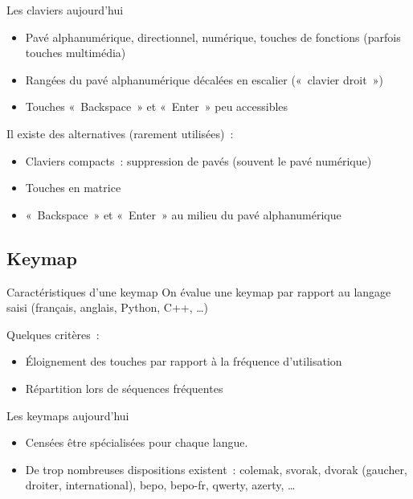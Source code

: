 \begin{frame}{Les claviers aujourd’hui}
  \begin{itemize}
    \item Pavé alphanumérique, directionnel, numérique, touches de fonctions
      (parfois touches multimédia) \pause

    \item Rangées du pavé alphanumérique décalées en escalier («~clavier
      droit~») \pause

    \item Touches «~Backspace~» et «~Enter~» peu accessibles \pause
  \end{itemize}

  Il existe des alternatives (rarement utilisées)~: \pause
  \begin{itemize}
    \item Claviers compacts~: suppression de pavés (souvent le pavé numérique)
      \pause

    \item Touches en matrice \pause

    \item «~Backspace~» et «~Enter~» au milieu du pavé alphanumérique
  \end{itemize}
\end{frame}



\subsection{Keymap}

\begin{frame}{Caractéristiques d’une keymap}
  On évalue une keymap par rapport au langage saisi (français, anglais, Python,
  C++, …) \pause

  Quelques critères~:
  \begin{itemize}
    \item Éloignement des touches par rapport à la fréquence d’utilisation
      \pause

    \item Répartition lors de séquences fréquentes
  \end{itemize}
\end{frame}

\begin{frame}{Les keymaps aujourd’hui}
  \begin{itemize}
    \item Censées être spécialisées pour chaque langue. \pause

    \item De trop nombreuses dispositions existent~: colemak, svorak, dvorak
      (gaucher, droiter, international), bepo, bepo-fr, qwerty, azerty, …
  \end{itemize}
\end{frame}
